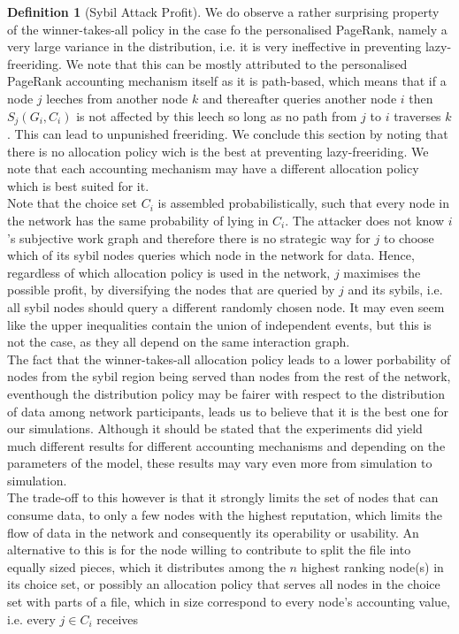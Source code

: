 \documentclass[11pt,a4paper]{article}
\theoremstyle{definition}
\newtheorem{definition}{Definition}[section]
\theoremstyle{theorem}
\theoremstyle{proposition}
\theoremstyle{corollary}
\theoremstyle{lemma}
\theoremstyle{example}
\theoremstyle{remark}
\begin{document}
\begin{definition}[Sybil Attack Profit]
\noindent{}We do observe a rather surprising property of the winner-takes-all policy in the case fo the personalised PageRank, namely a very large variance in the distribution, i.e. it is very ineffective in preventing lazy-freeriding. We note that this can be mostly attributed to the personalised PageRank accounting mechanism itself as it is path-based, which means that if a node $j$ leeches from another node $k$ and thereafter queries another node $i$ then $S_j(G_i,C_i)$ is not affected by this leech so long as no path from $j$ to $i$ traverses $k$. This can lead to unpunished freeriding. We conclude this section by noting that there is no allocation policy wich is the best at preventing lazy-freeriding. We note that each accounting mechanism may have a different allocation policy which is best suited for it. \vspace{1em}\\

\noindent{}Note that the choice set $C_i$ is assembled probabilistically, such that every node in the network has the same probability of lying in $C_i$. The attacker does not know $i$'s subjective work graph and therefore there is no strategic way for $j$ to choose which of its sybil nodes queries which node in the network for data. Hence, regardless of which allocation policy is used in the network, $j$ maximises the possible profit, by diversifying the nodes that are queried by $j$ and its sybils, i.e. all sybil nodes should query a different randomly chosen node. It may even seem like the upper inequalities contain the union of independent events, but this is not the case, as they all depend on the same interaction graph. \vspace{1em}\\
 
\noindent{}The fact that the winner-takes-all allocation policy leads to a lower porbability of nodes from the sybil region being served than nodes from the rest of the network, eventhough the distribution policy may be fairer with respect to the distribution of data among network participants, leads us to believe that it is the best one for our simulations. Although it should be stated that the experiments did yield much different results for different accounting mechanisms and depending on the parameters of the model, these results may vary even more from simulation to simulation. \vspace{1em}\\

\noindent{}The trade-off to this however is that it strongly limits the set of nodes that can consume data, to only a few nodes with the highest reputation, which limits the flow of data in the network and consequently its operability or usability. An alternative to this is for the node willing to contribute to split the file into equally sized pieces, which it distributes among the $n$ highest ranking node(s) in its choice set, or possibly an allocation policy that serves all nodes in the choice set with parts of a file, which in size correspond to every node's accounting value, i.e. every $j\in{}C_i$ receives


\end{definition}
\end{document}
